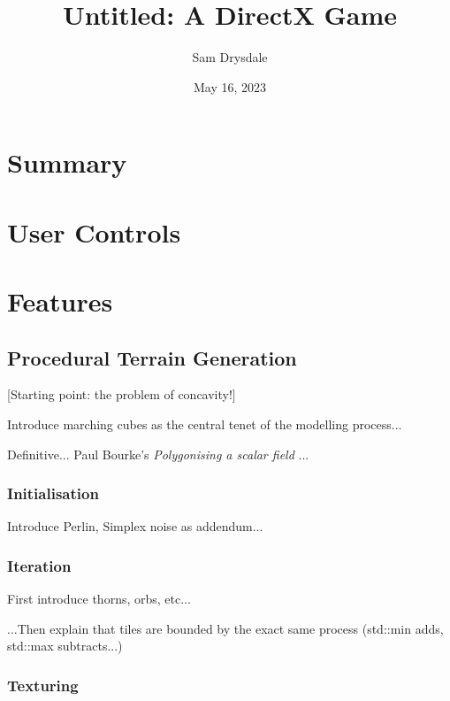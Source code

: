 \documentclass[a4paper, 11pt]{article}
\title{Untitled: A DirectX Game}
\author{Sam Drysdale}
\date{May 16, 2023}
\begin{document}
\graphicspath{{./Images/}}
\maketitle
\tableofcontents
\begin{flushleft}

\section{Summary}


\section{User Controls}


\section{Features}

\subsection{Procedural Terrain Generation}

[Starting point: the problem of concavity!]

\vspace{10pt}\noindent
Introduce marching cubes as the central tenet of the modelling process...

\vspace{10pt}\noindent
Definitive... Paul Bourke's \textit{Polygonising a scalar field} \citeyearpar{bourkeMarchingCubes}...

\subsubsection{Initialisation}

Introduce Perlin, Simplex noise as addendum...

\subsubsection{Iteration}

First introduce thorns, orbs, etc...

\vspace{10pt}\noindent
...Then explain that tiles are bounded by the exact same process (std::min adds, std::max subtracts...)

\subsubsection{Texturing}


\end{flushleft}
\end{document}
